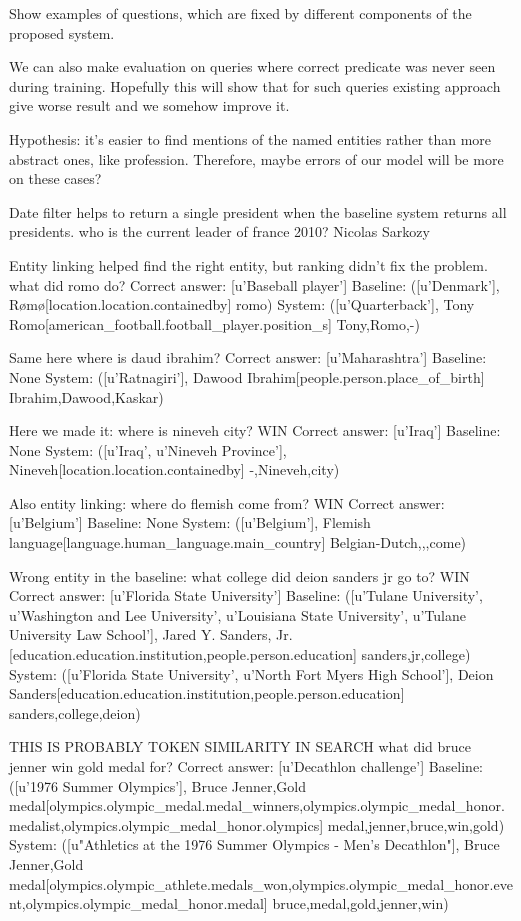
Show examples of questions, which are fixed by different components of the proposed system.

We can also make evaluation on queries where correct predicate was never seen during training. Hopefully this will show that for such queries existing approach give worse result and we somehow improve it.

Hypothesis: it's easier to find mentions of the named entities rather than more abstract ones, like profession.
Therefore, maybe errors of our model will be more on these cases?

Date filter helps to return a single president when the baseline system returns all presidents.
who is the current leader of france 2010?
Nicolas Sarkozy

Entity linking helped find the right entity, but ranking didn't fix the problem.
what did romo do? 
Correct answer:  [u'Baseball player']
Baseline:  ([u'Denmark'], Rømø[location.location.containedby] romo)
System:  ([u'Quarterback'], Tony Romo[american\_football.football\_player.position\_s] Tony,Romo,-)

Same here
where is daud ibrahim? 
Correct answer:  [u'Maharashtra']
Baseline:  None
System:  ([u'Ratnagiri'], Dawood Ibrahim[people.person.place\_of\_birth] Ibrahim,Dawood,Kaskar)


Here we made it:
where is nineveh city? WIN
Correct answer:  [u'Iraq']
Baseline:  None
System:  ([u'Iraq', u'Nineveh Province'], Nineveh[location.location.containedby] -,Nineveh,city)

Also entity linking:
where do flemish come from? WIN
Correct answer:  [u'Belgium']
Baseline:  None
System:  ([u'Belgium'], Flemish language[language.human\_language.main\_country] Belgian-Dutch,,,come)

Wrong entity in the baseline:
what college did deion sanders jr go to? WIN
Correct answer:  [u'Florida State University']
Baseline:  ([u'Tulane University', u'Washington and Lee University', u'Louisiana State University', u'Tulane University Law School'], Jared Y. Sanders, Jr.[education.education.institution,people.person.education] sanders,jr,college)
System:  ([u'Florida State University', u'North Fort Myers High School'], Deion Sanders[education.education.institution,people.person.education] sanders,college,deion)

THIS IS PROBABLY TOKEN SIMILARITY IN SEARCH
what did bruce jenner win gold medal for? 
Correct answer:  [u'Decathlon challenge']
Baseline:  ([u'1976 Summer Olympics'], Bruce Jenner,Gold medal[olympics.olympic\_medal.medal\_winners,olympics.olympic\_medal\_honor.medalist,olympics.olympic\_medal\_honor.olympics] medal,jenner,bruce,win,gold)
System:  ([u"Athletics at the 1976 Summer Olympics - Men's Decathlon"], Bruce Jenner,Gold medal[olympics.olympic\_athlete.medals\_won,olympics.olympic\_medal\_honor.event,olympics.olympic\_medal\_honor.medal] bruce,medal,gold,jenner,win)

